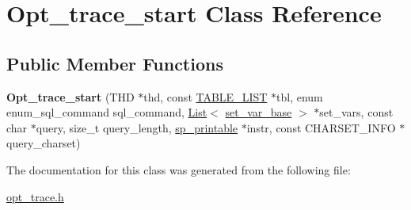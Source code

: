 \hypertarget{classOpt__trace__start}{}\section{Opt\+\_\+trace\+\_\+start Class Reference}
\label{classOpt__trace__start}
\subsection*{Public Member Functions}
\begin{DoxyCompactItemize}
\item 
\mbox{\label{classOpt__trace__start_a63471894040abcc7b235b0400c591ea9}} 
{\bfseries Opt\+\_\+trace\+\_\+start} (T\+HD $\ast$thd, const \mbox{\hyperlink{structTABLE__LIST}{T\+A\+B\+L\+E\+\_\+\+L\+I\+ST}} $\ast$tbl, enum enum\+\_\+sql\+\_\+command sql\+\_\+command, \mbox{\hyperlink{classList}{List}}$<$ \mbox{\hyperlink{classset__var__base}{set\+\_\+var\+\_\+base}} $>$ $\ast$set\+\_\+vars, const char $\ast$query, size\+\_\+t query\+\_\+length, \mbox{\hyperlink{classsp__printable}{sp\+\_\+printable}} $\ast$instr, const C\+H\+A\+R\+S\+E\+T\+\_\+\+I\+N\+FO $\ast$query\+\_\+charset)
\end{DoxyCompactItemize}


The documentation for this class was generated from the following file\+:\begin{DoxyCompactItemize}
\item 
\mbox{\hyperlink{opt__trace_8h}{opt\+\_\+trace.\+h}}\end{DoxyCompactItemize}
